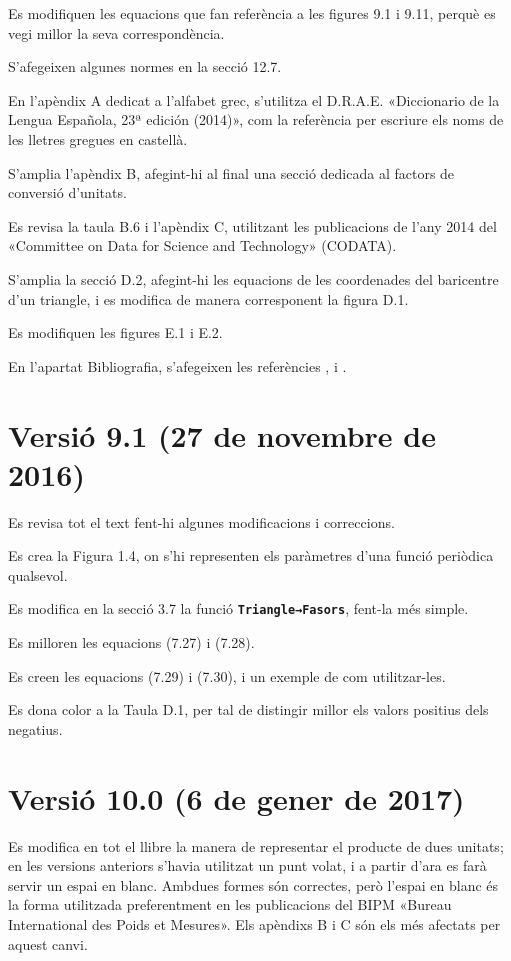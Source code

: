 Es modifiquen les equacions que fan referència a les figures 9.1 i 9.11, perquè es vegi millor la seva correspondència.

S'afegeixen algunes normes en la secció 12.7.

En l'apèndix A dedicat a l'alfabet grec, s'utilitza el D.R.A.E.
«Diccionario de la Lengua Española, 23ª
edición (2014)», com la referència per escriure els noms de les lletres gregues en castellà.

S'amplia l'apèndix B, afegint-hi al final una secció dedicada al factors de conversió d'unitats.

Es revisa la taula B.6 i l'apèndix C, utilitzant les publicacions de l'any 2014 del «Committee on Data for Science and Technology» (CODATA).


S'amplia la secció D.2, afegint-hi les equacions de les coordenades del baricentre d'un triangle, i es modifica de manera corresponent la figura D.1.

Es modifiquen les figures E.1 i E.2.

En l'apartat Bibliografia, s'afegeixen les referències \cite{VOS}, \cite{WMF} i \cite{TRA}.


\section*{Versió 9.1 (27 de novembre de 2016)}

Es revisa tot el text fent-hi algunes  modificacions i correccions.

Es crea la Figura 1.4, on s'hi representen els paràmetres d'una funció periòdica qualsevol.

Es modifica en la secció 3.7 la funció \texttt{\textbf{Triangle→Fasors}}, fent-la més simple.

Es milloren les equacions (7.27) i (7.28).

Es creen les equacions (7.29) i (7.30), i un exemple de com utilitzar-les.

Es dona color a la Taula D.1, per tal de distingir millor els valors positius dels negatius.

\section*{Versió 10.0 (6 de gener de 2017)}

Es modifica en tot el llibre la manera de representar el producte de dues unitats; en les versions anteriors s'havia utilitzat un punt volat, i a partir d'ara es farà servir un espai en blanc. Ambdues formes són correctes, però l'espai en blanc és la forma utilitzada preferentment en les publicacions del BIPM «Bureau International des Poids et Mesures». Els apèndixs B i C són els més afectats per aquest canvi.


